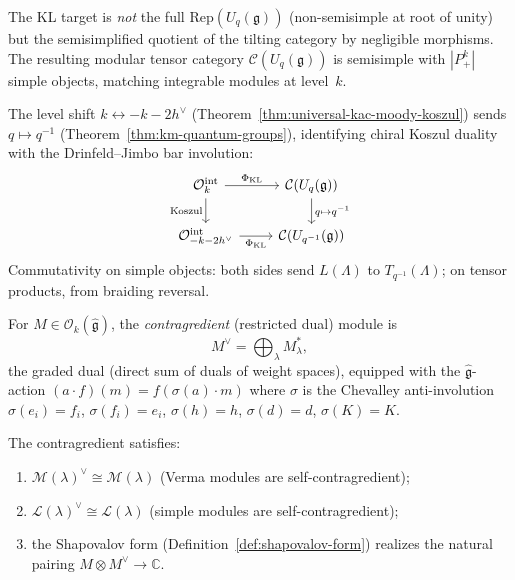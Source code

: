 \begin{remark}\label{rem:kl-category-precision}
The KL target is \emph{not} the full $\mathrm{Rep}(U_q(\mathfrak{g}))$ (non-semisimple at root of unity) but the semisimplified quotient of the tilting category by negligible morphisms.  The resulting modular tensor category $\mathcal{C}(U_q(\mathfrak{g}))$ is semisimple with $|P_+^k|$ simple objects, matching integrable modules at level~$k$.
\end{remark}

\begin{remark}
\label{rem:kl-koszul}
The level shift $k \leftrightarrow -k-2h^\vee$ (Theorem~\ref{thm:universal-kac-moody-koszul}) sends $q \mapsto q^{-1}$ (Theorem~\ref{thm:km-quantum-groups}), identifying chiral Koszul duality with the Drinfeld--Jimbo bar involution:
\[
\begin{tikzcd}
\mathcal{O}_k^{\mathrm{int}} \arrow[r, "\Phi_{\mathrm{KL}}"]
   \arrow[d, "\mathrm{Koszul}"'] &
\mathcal{C}(U_q(\mathfrak{g}))
   \arrow[d, "q \mapsto q^{-1}"] \\
\mathcal{O}_{-k-2h^\vee}^{\mathrm{int}}
   \arrow[r, "\Phi_{\mathrm{KL}}"'] &
\mathcal{C}(U_{q^{-1}}(\mathfrak{g}))
\end{tikzcd}
\]
Commutativity on simple objects: both sides send $L(\Lambda)$ to $T_{q^{-1}}(\Lambda)$; on tensor products, from braiding reversal.
\end{remark}

\begin{definition}
\label{def:contragredient-module}
For $M \in \mathcal{O}_k(\widehat{\mathfrak{g}})$, the
\emph{contragredient} (restricted dual) module is
\[
M^\vee = \bigoplus_\lambda M_\lambda^*,
\]
the graded dual (direct sum of duals of weight spaces), equipped
with the $\widehat{\mathfrak{g}}$-action
$(a \cdot f)(m) = f(\sigma(a) \cdot m)$
where $\sigma$ is the Chevalley anti-involution
$\sigma(e_i) = f_i$, $\sigma(f_i) = e_i$,
$\sigma(h) = h$, $\sigma(d) = d$, $\sigma(K) = K$.

The contragredient satisfies:
\begin{enumerate}[label=\textup{(\roman*)}]
\item $\mathcal{M}(\lambda)^\vee \cong \mathcal{M}(\lambda)$ (Verma
  modules are self-contragredient);
\item $\mathcal{L}(\lambda)^\vee \cong \mathcal{L}(\lambda)$ (simple
  modules are self-contragredient);
\item the Shapovalov form (Definition~\ref{def:shapovalov-form})
  realizes the natural pairing
  $M \otimes M^\vee \to \mathbb{C}$.
\end{enumerate}
\end{definition}

